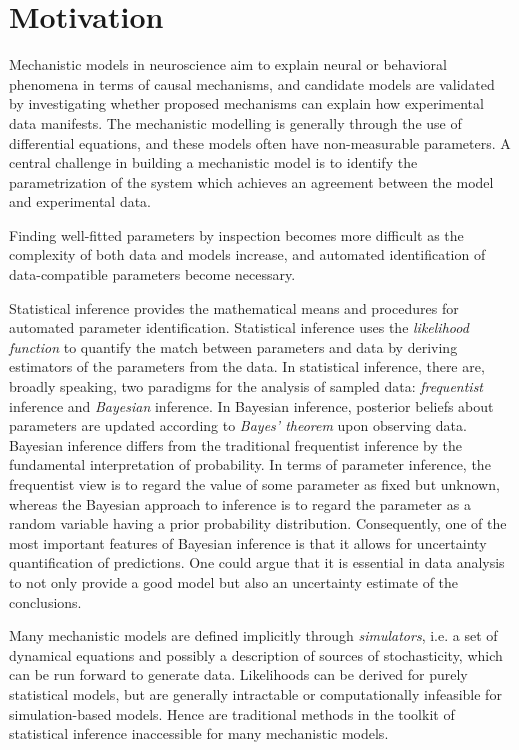 \section{Motivation}\label{sec:Motivation}

Mechanistic models in neuroscience aim to explain neural or behavioral phenomena in terms of causal mechanisms, and candidate models are validated by investigating whether proposed mechanisms can explain how experimental data manifests. The mechanistic modelling is generally through the use of differential equations, and these models often have non-measurable parameters. A central challenge in building a mechanistic model is to identify the parametrization of the system which achieves an agreement between the model and experimental data. 

Finding well-fitted parameters by inspection becomes more difficult as the complexity of both data and models increase, and automated identification of data-compatible parameters become necessary. 

Statistical inference provides the mathematical means and procedures for automated parameter identification.  Statistical inference uses the \textit{likelihood function} to quantify the match between parameters and data by deriving estimators of the parameters from the data. In statistical inference, there are, broadly speaking, two paradigms for the analysis of sampled data: \textit{frequentist} inference and \textit{Bayesian} inference. In Bayesian inference, posterior beliefs about parameters are updated according to \textit{Bayes' theorem} upon observing data. Bayesian inference differs from the traditional frequentist inference by the fundamental interpretation of probability. In terms of parameter inference, the frequentist view is to regard the value of some parameter as fixed but unknown, whereas the Bayesian approach to inference is to regard the parameter as a random variable having a prior probability distribution. Consequently, one of the most important features of Bayesian inference is that it allows for uncertainty quantification of predictions. One could argue that it is essential in data analysis to not only provide a good model but also an uncertainty estimate of the conclusions. 

Many mechanistic models are defined implicitly through \textit{simulators}, i.e. a set of dynamical equations and possibly a description of sources of stochasticity, which can be run forward to generate data. Likelihoods can be derived for purely statistical models, but are generally intractable or computationally infeasible for simulation-based models. Hence are traditional methods in the toolkit of statistical inference inaccessible for many mechanistic models.

